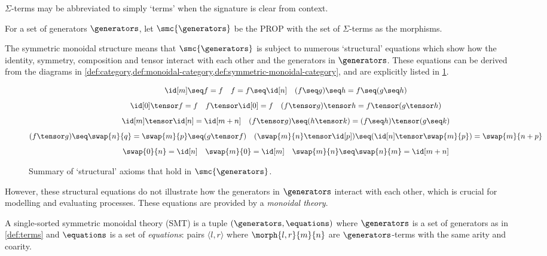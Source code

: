 \(\Sigma\)-terms may be abbreviated to simply `terms' when the signature is
clear from context.

\begin{definition}
    For a set of generators \(\generators\), let \(\smc{\generators}\) be the
    PROP with the set of \(\Sigma\)-terms as the morphisms.
\end{definition}

The symmetric monoidal structure means that \(\smc{\generators}\) is subject to
numerous `structural' equations which show how the identity, symmetry,
composition and tensor interact with each other and the generators in
\(\generators\).
These equations can be derived from the diagrams in
\cref{def:category,def:monoidal-category,def:symmetric-monoidal-category}, and
are explicitly listed in \cref{fig:prop-axioms}.

\begin{figure}
    \centering
    \begin{gather*}
        \id[m] \seq  f = f
        \quad
        f = f \seq \id[n]
        \quad
        (f \seq g) \seq h = f \seq (g \seq h)
        \\[0.5em]
        \id[0] \tensor f = f
        \quad
        f \tensor \id[0] = f
        \quad
        (f \tensor g) \tensor h = f \tensor (g \tensor h)
        \\[0.5em]
        \id[m] \tensor \id[n] = \id[m+n]
        \quad
        (f \tensor g) \seq (h \tensor k) = (f \seq h) \tensor (g \seq k)
        \\[0.5em]
        (f \tensor g) \seq \swap{n}{q} = \swap{m}{p} \seq (g \tensor f)
        \quad
        (\swap{m}{n} \tensor \id[p]) \seq (\id[n] \tensor \swap{m}{p}) = \swap{m}{n+p}
        \\[0.5em]
        \swap{0}{n} = \id[n]
        \quad
        \swap{m}{0} = \id[m]
        \quad
        \swap{m}{n} \seq \swap{n}{m} = \id[m+n]
    \end{gather*}
    \caption{Summary of `structural' axioms that hold in \(\smc{\generators}\).}
    \label{fig:prop-axioms}
\end{figure}

However, these structural equations do not illustrate how the generators in
\(\generators\) interact with each other, which is crucial for modelling and
evaluating processes.
These equations are provided by a \emph{monoidal theory}.

\begin{definition}
    A single-sorted symmetric monoidal theory (SMT) is a tuple \(
        (\generators, \equations)
    \) where \(\generators\) is a set of generators as in \cref{def:terms} and
    \(\equations\) is a set of \emph{equations}: pairs \(\langle l, r\rangle\)
    where \(\morph{l, r}{m}{n}\) are \(\generators\)-terms with the same arity
    and coarity.
\end{definition}


